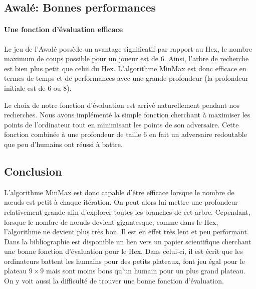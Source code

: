 


\subsection{Awalé: Bonnes performances}
\paragraph{Une fonction d'évaluation efficace} 
Le jeu de l'Awalé possède un avantage significatif par rapport au Hex, le nombre maximum de coups
possible pour un joueur est de 6. Ainsi, l'arbre de recherche est bien plus petit que celui du Hex. L'algorithme MinMax est donc efficace en termes de
temps et de performances avec une grande profondeur (la profondeur initiale est de 6 ou 8).

Le choix de notre fonction d'évaluation est arrivé naturellement pendant nos recherches. Nous avons implémenté la simple fonction cherchant à
maximiser les points de l'ordinateur tout en minimisant les points de son adversaire. Cette fonction combinée à une profondeur de taille 6 en fait un
adversaire redoutable que peu d'humains ont réussi à battre.

\subsection{Conclusion}
L'algorithme MinMax est donc capable d'être efficace lorsque le nombre de nœuds est petit à chaque itération. On peut alors
lui mettre une profondeur relativement grande afin d'explorer toutes les branches de cet arbre.
Cependant, lorsque le nombre de nœuds devient gigantesque, comme dans le Hex, l'algorithme ne devient plus très bon. Il est en effet très lent et peu performant.
Dans la bibliographie est disponible un lien vers un papier scientifique cherchant une bonne fonction d'évaluation pour le Hex.
Dans celui-ci, il est écrit que les ordinateurs battent les humains pour des petits plateaux, font jeu égal pour le plateau $9\times9$ mais
sont moins bons qu'un humain pour un plus grand plateau. On y voit aussi la difficulté de trouver une bonne fonction d'évaluation.
